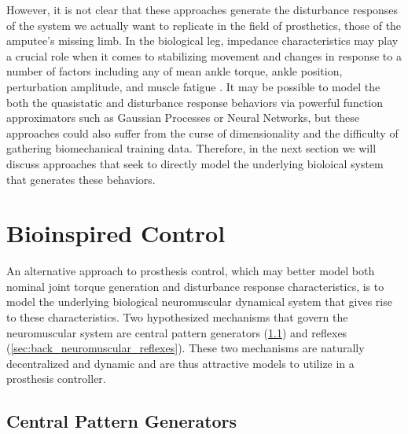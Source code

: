 However, it is not clear that these approaches generate the disturbance
responses of the system we actually want to replicate in the field of
prosthetics, those of the amputee's missing limb. In the biological leg,
impedance characteristics may play a crucial role when it comes to stabilizing
movement \citep{won1995stability, burdet2001central} and changes in response to
a number of factors including any of mean ankle torque, ankle position,
perturbation amplitude, and muscle fatigue \citep{kearney1989system}. It may be
possible to model the both the quasistatic and disturbance response behaviors
via powerful function approximators such as Gaussian Processes or Neural
Networks, but these approaches could also suffer from the curse of
dimensionality and the difficulty of gathering biomechanical training data.
Therefore, in the next section we will discuss approaches that seek to directly
model the underlying bioloical system that generates these behaviors.

\section{Bioinspired Control}\label{sec:back_bioinspired_pros_control} 

An alternative approach to prosthesis control, which may better model both
nominal joint torque generation and disturbance response characteristics, is to
model the underlying biological neuromuscular dynamical system that gives rise
to these characteristics. Two hypothesized mechanisms that govern the
neuromuscular system are central pattern generators (\cref{sec:back_CPG}) and
reflexes (\cref{sec:back_neuromuscular_reflexes}). These two mechanisms are
naturally decentralized and dynamic and are thus attractive models to utilize in
a prosthesis controller.

\subsection{Central Pattern Generators}\label{sec:back_CPG}
